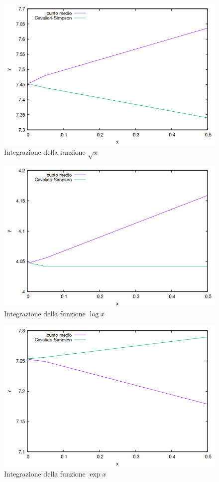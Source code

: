 \documentclass{article}
\begin{document}
\begin{figure}[ht]
   \centering
   \includegraphics*[scale=.5]{../grafici/immagini/sqrt_integrazione.png}
   \caption{Integrazione della funzione $\sqrt{x}$}
\end{figure}
\begin{figure}[ht]
   \centering
   \includegraphics*[scale=.5]{../grafici/immagini/log_integrazione.png}
   \caption{Integrazione della funzione $\log x$}
\end{figure}
\begin{figure}[ht]
   \centering
   \includegraphics*[scale=.5]{../grafici/immagini/exp_integrazione.png}
   \caption{Integrazione della funzione $\exp x$}
\end{figure}
\end{document}

